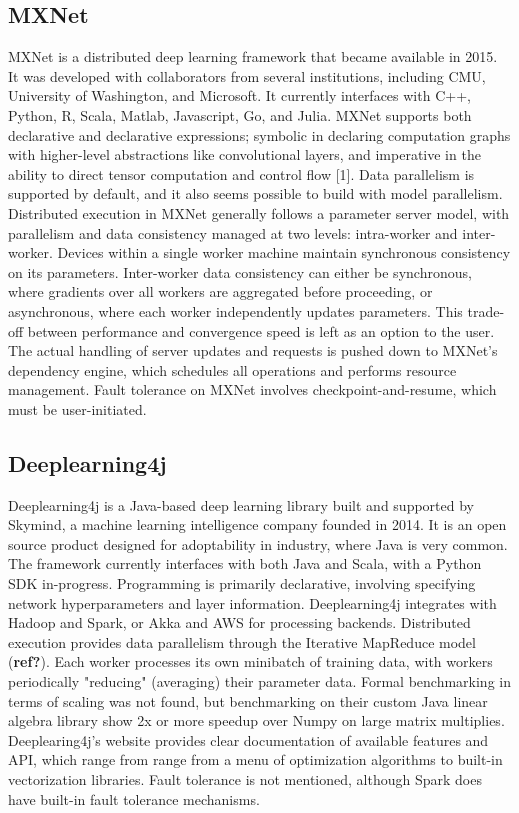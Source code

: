 \documentclass{article}
\begin{document}
\subsection{MXNet}
MXNet is a distributed deep learning framework that became available in 2015. It was developed with collaborators from several institutions, including CMU, University of Washington, and Microsoft. It currently interfaces with C++, Python, R, Scala, Matlab, Javascript, Go, and Julia. MXNet supports both declarative and declarative expressions; symbolic in declaring computation graphs with higher-level abstractions like convolutional layers, and imperative in the ability to direct tensor computation and control flow [1]. Data parallelism is supported by default, and it also seems possible to build with model parallelism. Distributed execution in MXNet generally follows a parameter server model, with parallelism and data consistency managed at two levels: intra-worker and inter-worker. Devices within a single worker machine maintain synchronous consistency on its parameters. Inter-worker data consistency can either be synchronous, where gradients over all workers are aggregated before proceeding, or asynchronous, where each worker independently updates parameters. This trade-off between performance and convergence speed is left as an option to the user. The actual handling of server updates and requests is pushed down to MXNet's dependency engine, which schedules all operations and performs resource management. Fault tolerance on MXNet involves checkpoint-and-resume, which must be user-initiated. 

\subsection{Deeplearning4j}
Deeplearning4j is a Java-based deep learning library built and supported by Skymind, a machine learning intelligence company founded in 2014. It is an open source product designed for adoptability in industry, where Java is very common. The framework currently interfaces with both Java and Scala, with a Python SDK in-progress. Programming is primarily declarative, involving specifying network hyperparameters and layer information. Deeplearning4j integrates with Hadoop and Spark, or Akka and AWS for processing backends. Distributed execution provides data parallelism through the Iterative MapReduce model (\textbf{ref?}). Each worker processes its own minibatch of training data, with workers periodically "reducing" (averaging) their parameter data. Formal benchmarking in terms of scaling was not found, but benchmarking on their custom Java linear algebra library show 2x or more speedup over Numpy on large matrix multiplies. Deeplearing4j's website provides clear documentation of available features and API, which range from range from a menu of optimization algorithms to built-in vectorization libraries. Fault tolerance is not mentioned, although Spark does have built-in fault tolerance mechanisms. 
\end{document}
